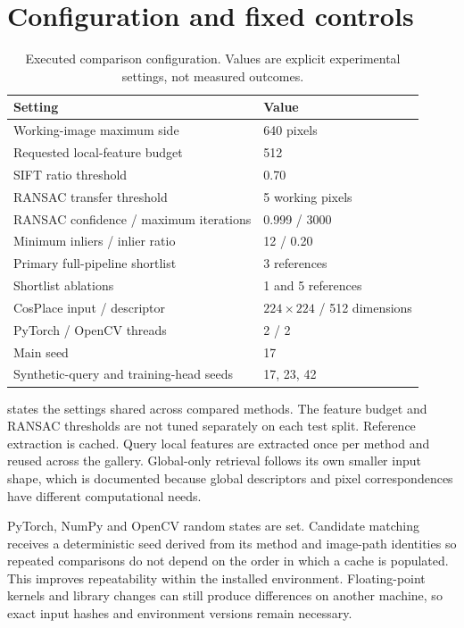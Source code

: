 \section{Configuration and fixed controls}
\begin{table}[htbp]\centering\small
\caption{Executed comparison configuration. Values are explicit experimental settings, not measured outcomes.}\label{tab:configuration}
\begin{tabular}{ll}\toprule
Setting & Value\\\midrule
Working-image maximum side & 640 pixels\\
Requested local-feature budget & 512\\
SIFT ratio threshold & 0.70\\
RANSAC transfer threshold & 5 working pixels\\
RANSAC confidence / maximum iterations & 0.999 / 3000\\
Minimum inliers / inlier ratio & 12 / 0.20\\
Primary full-pipeline shortlist & 3 references\\
Shortlist ablations & 1 and 5 references\\
CosPlace input / descriptor & $224\times224$ / 512 dimensions\\
PyTorch / OpenCV threads & 2 / 2\\
Main seed & 17\\
Synthetic-query and training-head seeds & 17, 23, 42\\
\bottomrule\end{tabular}
\end{table}
 states the settings shared across compared methods. The feature budget and RANSAC thresholds are not tuned separately on each test split. Reference extraction is cached. Query local features are extracted once per method and reused across the gallery. Global-only retrieval follows its own smaller input shape, which is documented because global descriptors and pixel correspondences have different computational needs.

PyTorch, NumPy and OpenCV random states are set. Candidate matching receives a deterministic seed derived from its method and image-path identities so repeated comparisons do not depend on the order in which a cache is populated. This improves repeatability within the installed environment. Floating-point kernels and library changes can still produce differences on another machine, so exact input hashes and environment versions remain necessary.

